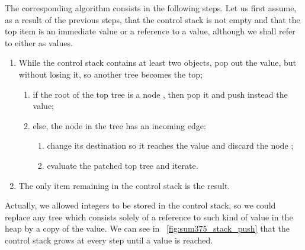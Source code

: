 The corresponding algorithm consists in the following steps. Let us
first assume, as a result of the previous steps, that the control
stack is not empty and that the top item is an immediate value or a
reference to a value, although we shall refer to either as values.
\begin{enumerate}

  \item While the control stack contains at least two objects, pop out
    the value, but without losing it, so another tree becomes the top;
    \begin{enumerate}
      
    \item if the root of the top tree is a node , then
      pop it and push instead the value;
      
    \item else, the node  in the tree has an incoming edge:
      \begin{enumerate}
        
      \item change its destination so it reaches the value and discard
        the node ;
        
      \item evaluate the patched top tree and iterate.
        
      \end{enumerate}
      
    \end{enumerate}
    
  \item The only item remaining in the control stack is the result.
    
\end{enumerate}
Actually, we allowed integers to be stored in the control stack, so we could replace any tree which consists solely of a reference to such kind of value in the heap by a copy of the value.  We can see in \fig~\ref{fig:sum375_stack_push} that the control stack grows at every step until a value is reached.   



